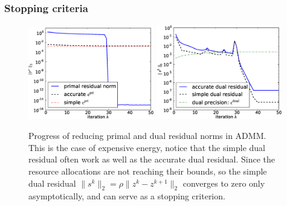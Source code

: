 \subsubsection{Stopping criteria}
\begin{figure}[th]
\centering
\includegraphics[width=0.49\textwidth]{figures/test_primal_e.eps}
\includegraphics[width=0.49\textwidth]{figures/test_dual_e.eps}
\caption{Progress of reducing primal and dual residual norms in ADMM.
    This is the case of expensive energy, notice that the simple dual
residual often work as well as the accurate dual residual. Since
the resource allocations are not reaching their bounds, so the simple
dual residual $\|s^k\|_2=\rho\|z^{k}-z^{k+1}\|_2$ converges to zero 
only asymptotically, and can serve as a stopping criterion.}
\label{fig:residual-e}
\end{figure}

